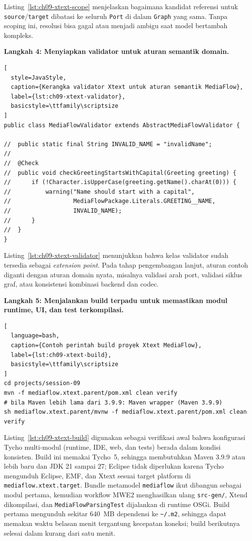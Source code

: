 \noindent Listing~\ref{lst:ch09-xtext-scope} menjelaskan bagaimana kandidat referensi untuk \texttt{source}/\texttt{target} dibatasi ke seluruh \texttt{Port} di dalam \texttt{Graph} yang sama. Tanpa scoping ini, resolusi bisa gagal atau menjadi ambigu saat model bertambah kompleks.

\textbf{Langkah 4: Menyiapkan validator untuk aturan semantik domain.}
\begin{lstlisting}[
  style=JavaStyle,
  caption={Kerangka validator Xtext untuk aturan semantik MediaFlow},
  label={lst:ch09-xtext-validator},
  basicstyle=\ttfamily\scriptsize
]
public class MediaFlowValidator extends AbstractMediaFlowValidator {

//  public static final String INVALID_NAME = "invalidName";
//
//  @Check
//  public void checkGreetingStartsWithCapital(Greeting greeting) {
//      if (!Character.isUpperCase(greeting.getName().charAt(0))) {
//          warning("Name should start with a capital",
//                  MediaFlowPackage.Literals.GREETING__NAME,
//                  INVALID_NAME);
//      }
//  }
}
\end{lstlisting}

\noindent Listing~\ref{lst:ch09-xtext-validator} menunjukkan bahwa kelas validator sudah tersedia sebagai \textit{extension point}. Pada tahap pengembangan lanjut, aturan contoh diganti dengan aturan domain nyata, misalnya validasi arah port, validasi siklus graf, atau konsistensi kombinasi backend dan codec.

\textbf{Langkah 5: Menjalankan build terpadu untuk memastikan modul runtime, UI, dan test terkompilasi.}
\begin{lstlisting}[
  language=bash,
  caption={Contoh perintah build proyek Xtext MediaFlow},
  label={lst:ch09-xtext-build},
  basicstyle=\ttfamily\scriptsize
]
cd projects/session-09
mvn -f mediaflow.xtext.parent/pom.xml clean verify
# bila Maven lebih lama dari 3.9.9: Maven wrapper (Maven 3.9.9)
sh mediaflow.xtext.parent/mvnw -f mediaflow.xtext.parent/pom.xml clean verify
\end{lstlisting}

\noindent Listing~\ref{lst:ch09-xtext-build} digunakan sebagai verifikasi awal bahwa konfigurasi Tycho multi-modul (runtime, IDE, web, dan tests) berada dalam kondisi konsisten. Build ini memakai Tycho~5, sehingga membutuhkan Maven 3.9.9 atau lebih baru dan JDK 21 sampai 27; Eclipse tidak diperlukan karena Tycho mengunduh Eclipse, EMF, dan Xtext sesuai target platform di \texttt{mediaflow.xtext.target}. Bundle metamodel \texttt{mediaflow} ikut dibangun sebagai modul pertama, kemudian workflow MWE2 menghasilkan ulang \texttt{src-gen/}, Xtend dikompilasi, dan \texttt{MediaFlowParsingTest} dijalankan di runtime OSGi. Build pertama mengunduh sekitar 640~MB dependensi ke \texttt{\textasciitilde/.m2}, sehingga dapat memakan waktu belasan menit tergantung kecepatan koneksi; build berikutnya selesai dalam kurang dari satu menit.

